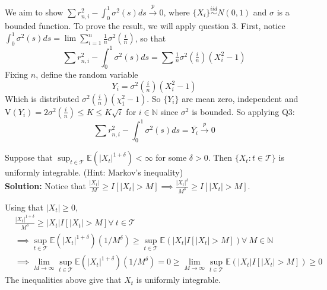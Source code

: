 \documentclass[11pt,letterpaper]{article}                  %
\newcommand{\Var}{\mathrm{V}} %
\begin{document}
\bigskip
\begin{problem} We aim to show $\sum r^2_{n,i} - \int_0^1 \sigma^2(s)
  ds \xrightarrow[]{p} 0$, where $\{X_i\} \overset{iid}{\sim} N(0,1)$
  and $\sigma$ is a bounded function. To prove the result, we will apply question 3.  First, notice
  $\int_0^1 \sigma^2(s) ds = \lim \sum_{i=1}^n \tfrac{1}{n} \sigma^2(
  \tfrac{i}{ n}) $, so that
  \begin{equation*}
 \sum r^2_{n,i} - \int_0^1 \sigma^2(s) ds = \sum
  \tfrac{1}{n}\sigma^2( \tfrac{i}{ n}) \left( X_i^2 - 1 \right)
\end{equation*}
Fixing $n$, define the random variable
\begin{equation*}
  Y_i = \sigma^2(\tfrac{i}{n}) \left( X_i^2 - 1 \right)
\end{equation*}
Which is distributed $\sigma^2(\tfrac{i}{n}) \left( \chi^2_1 -
  1\right)$. So $\{ Y_i\}$ are mean zero, independent and $\Var (Y_i) =
2 \sigma^2(\tfrac{i}{n}) \le K \le K \sqrt{i}$ for $i \in \mathbb{N}$
since $\sigma^2$ is bounded. So applying Q3:
\begin{equation*}
   \sum r^2_{n,i} - \int_0^1 \sigma^2(s) ds = \overline{Y_i}
   \xrightarrow[]{p} 0
\end{equation*}
\end{problem}

\bigskip
\begin{problem}
Suppose that $\sup_{t \in \mathcal{T}} \mathbb{E}(|X_t|^{1+\delta}) < \infty$ for some $\delta >0$. Then $\{X_t : t \in \mathcal{T}\}$ is uniformly integrable. (Hint: Markov's inequality) \\

\textbf{Solution:} Notice that $\frac{|X_t|}{M} \geq I[|X_t|>M] \implies \frac{|X_t|^{\delta}}{M^{\delta}} \geq I[|X_t|>M]$. 

Using that $|X_t|\geq 0$,
\begin{align*}
&\frac{|X_t|^{1+\delta}}{M^{\delta}}\geq |X_t| I[|X_t|>M] \forall \ t \in \mathcal{T}\\
&\implies \sup_{t \in \mathcal{T}} \mathbb{E}(|X_t|^{1+\delta}) (1/M^{\delta}) \geq \sup_{t \in \mathcal{T}} \mathbb{E}(|X_t|I[|X_t|>M]) \forall \ M \in \mathbb{N} \\
&\implies \lim_{M \to \infty} \sup_{t \in \mathcal{T}} \mathbb{E}(|X_t|^{1+\delta}) (1/M^{\delta}) = 0 \geq \lim_{M \to \infty} \sup_{t \in \mathcal{T}} \mathbb{E}(|X_t|I[|X_t|>M]) \geq 0
\end{align*}
The inequalities above give that $X_t$ is uniformly integrable.
\end{problem}
\end{document}
